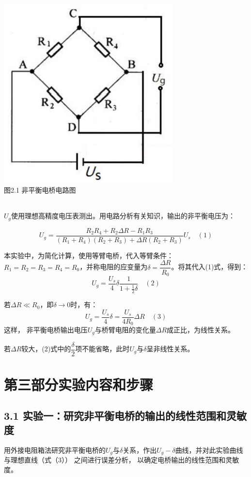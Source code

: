 \documentclass{ctexart}
\begin{document}
    ~\\
    \begin{minipage}[c]{1\textwidth}
        \centering \includegraphics[scale=1]{1} \\\small{图2.1 非平衡电桥电路图}
    \end{minipage}
    ~\\

    $U_g$使用理想高精度电压表测出。用电路分析有关知识，输出的非平衡电压为：

    $$ U_g=\dfrac{R_2 R_4+R_2 \Delta R-R_1 R_3}{(R_1+R_4)(R_2+R_3)+\Delta R(R_2+R_3)}U_s \quad (1)$$

    本实验中，为简化计算，使用等臂电桥，代入等臂条件：$R_1=R_2=R_3=R_4=R_0$，并称电阻的应变量为$\delta=\dfrac{\Delta R}{R_0}$。将其代入(1)式，得到：
    $$U_g=\dfrac{U_s}{4} \delta \dfrac{1}{1+\frac{1}{2}\delta}\quad (2)$$

    若$\Delta R \ll R_0$，即$\delta \rightarrow 0$时，有：
    $$U_g=\dfrac{U_s}{4}\delta=\dfrac{U_s}{4 R_0}\Delta R \quad (3)$$
    这样， 非平衡电桥输出电压$U_g$与桥臂电阻的变化量$\Delta R$成正比，为线性关系。 

    若$\Delta R$较大，(2)式中的$\dfrac{\delta}{2}$项不能省略，此时$U_g$与$\delta$呈非线性关系。

    \section*{第三部分\quad 实验内容和步骤}
\subsection*{3.1 \quad 实验一：研究非平衡电桥的输出的线性范围和灵敏度}
用外接电阻箱法研究非平衡电桥的$U_g$与$\delta$关系，作出$U_g - \delta$曲线，并对此实验曲线与理想直线（式（3）） 之间进行误差分析， 以确定电桥输出的线性范围和灵敏度。
\end{document}
